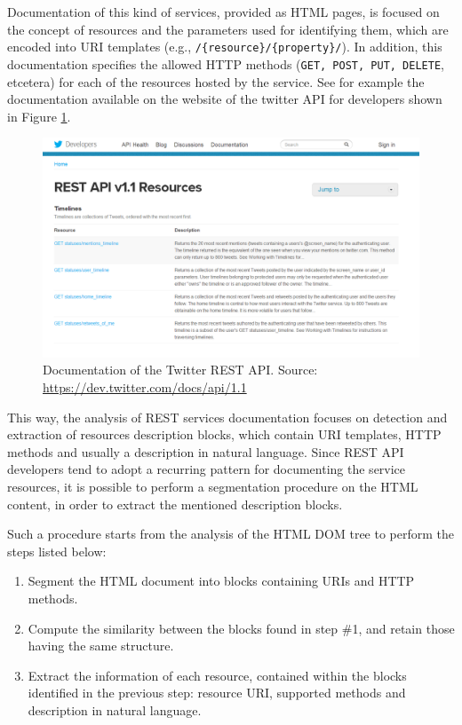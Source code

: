 Documentation of this kind of services, provided as HTML pages, is focused on the concept of resources and the parameters used for identifying them, which are encoded into URI templates (e.g., \texttt{/\{resource\}/\{property\}/}). In addition, this documentation specifies the allowed HTTP methods
(\texttt{GET, POST, PUT, DELETE}, etcetera) for each of the resources hosted by the service. See for example the documentation available on the website of the twitter API for developers shown in Figure \ref{twitter-rest-api}.

\begin{figure}
\includegraphics[scale=0.38]{images/twitter-rest-api}

\caption{Documentation of the Twitter REST API.{\scriptsize{} Source: \protect\href{https://dev.twitter.com/docs/api/1.1}{https://dev.twitter.com/docs/api/1.1}}}
\label{twitter-rest-api}

\end{figure}

This way, the analysis of REST services documentation focuses on detection and extraction of resources description blocks, which contain URI templates, HTTP methods and usually a description in natural language. Since REST API developers tend to adopt a recurring pattern for documenting
the service resources, it is possible to perform a segmentation procedure on the HTML content, in order to extract the mentioned description blocks. 

Such a procedure starts from the analysis of the HTML DOM tree to perform the steps listed below:

\begin{enumerate}
 \item Segment the HTML document into blocks containing URIs and HTTP methods. 
 \item Compute the similarity between the blocks found in step \#1, and retain those having the same structure.
 \item Extract the information of each resource, contained within the blocks identified in the previous step: resource URI, supported methods and description in natural language.
\end{enumerate}

